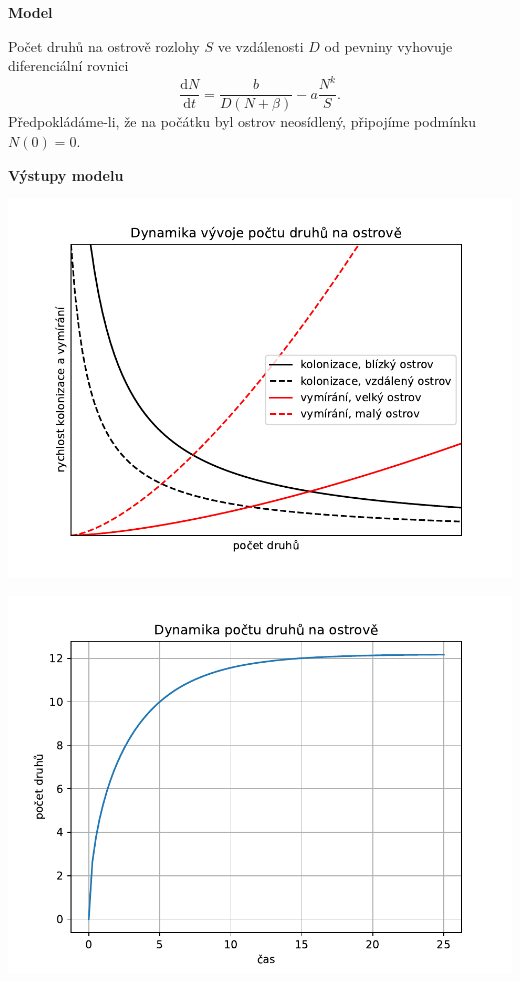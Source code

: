 \documentclass[handouts]{beamer}
\def\subsection#1{\par\medskip \textbf{#1}\par\medskip}
\begin{document}
\begin{frame}
\bigskip
\subsection{Model}

Počet druhů na ostrově rozlohy $S$ ve
vzdálenosti $D$ od pevniny vyhovuje diferenciální rovnici
$$
  \frac{\mathrm dN}{\mathrm dt}= \frac b{D(N+\beta)}-a\frac {N^k}S.
$$
Předpokládáme-li, že na počátku byl ostrov neosídlený, připojíme
podmínku $N(0)=0$.

\subsection{Výstupy modelu}


\begin{minipage}[t]{0.5\linewidth}
  \includegraphics[width=\linewidth]{ostrov1.pdf}
\end{minipage}\begin{minipage}[t]{0.5\linewidth}
  \includegraphics[width=\linewidth]{ostrov2.pdf}
\end{minipage}


\end{frame}
\end{document}
